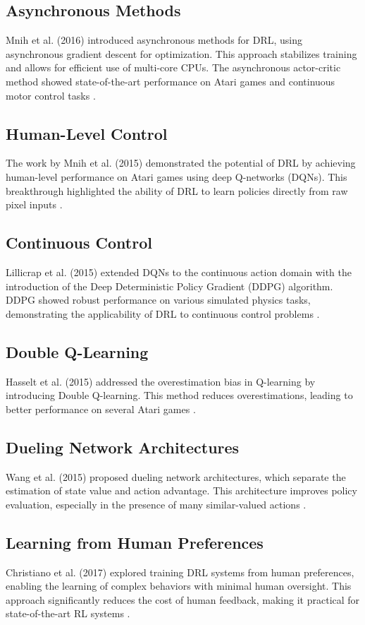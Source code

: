 \documentclass{article}
\begin{document}
\subsection{Asynchronous Methods}
Mnih et al. (2016) introduced asynchronous methods for DRL, using asynchronous gradient descent for optimization. This approach stabilizes training and allows for efficient use of multi-core CPUs. The asynchronous actor-critic method showed state-of-the-art performance on Atari games and continuous motor control tasks \cite{mnih2016asynchronous}.

\subsection{Human-Level Control}
The work by Mnih et al. (2015) demonstrated the potential of DRL by achieving human-level performance on Atari games using deep Q-networks (DQNs). This breakthrough highlighted the ability of DRL to learn policies directly from raw pixel inputs \cite{mnih2015human}.

\subsection{Continuous Control}
Lillicrap et al. (2015) extended DQNs to the continuous action domain with the introduction of the Deep Deterministic Policy Gradient (DDPG) algorithm. DDPG showed robust performance on various simulated physics tasks, demonstrating the applicability of DRL to continuous control problems \cite{lillicrap2015continuous}.

\subsection{Double Q-Learning}
Hasselt et al. (2015) addressed the overestimation bias in Q-learning by introducing Double Q-learning. This method reduces overestimations, leading to better performance on several Atari games \cite{hasselt2015double}.

\subsection{Dueling Network Architectures}
Wang et al. (2015) proposed dueling network architectures, which separate the estimation of state value and action advantage. This architecture improves policy evaluation, especially in the presence of many similar-valued actions \cite{wang2015dueling}.

\subsection{Learning from Human Preferences}
Christiano et al. (2017) explored training DRL systems from human preferences, enabling the learning of complex behaviors with minimal human oversight. This approach significantly reduces the cost of human feedback, making it practical for state-of-the-art RL systems \cite{christiano2017deep}.
\end{document}
